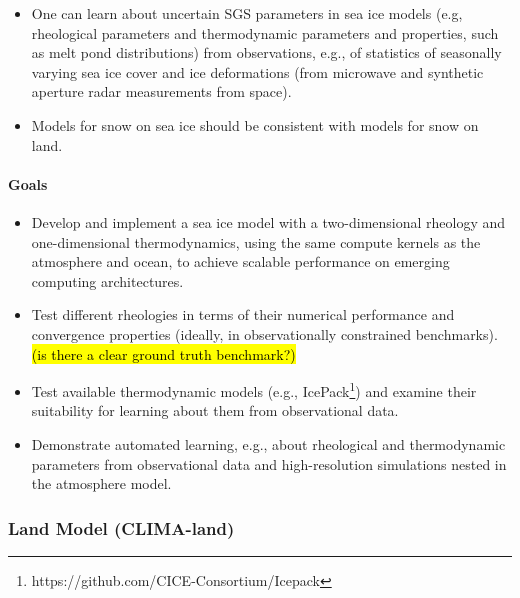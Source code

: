 \documentclass{article}
\begin{document}
\begin{itemize}
\item One can learn about uncertain SGS parameters in sea ice models (e.g, rheological parameters and thermodynamic parameters and properties, such as melt pond distributions) from observations, e.g., of statistics of seasonally varying sea ice cover and ice deformations (from microwave and synthetic aperture radar measurements from space).
\item Models for snow on sea ice should be consistent with models for snow on land.
\end{itemize}

\paragraph{Goals}
\begin{itemize}
    \item Develop and implement a sea ice model with a two-dimensional rheology and one-dimensional thermodynamics, using the same compute kernels as the atmosphere and ocean, to achieve scalable performance on emerging computing architectures. 
    \item Test different rheologies in terms of their numerical performance and convergence properties (ideally, in observationally constrained benchmarks). \hl{(is there a clear ground truth benchmark?)}
    \item Test available thermodynamic models (e.g., IcePack\footnote{https://github.com/CICE-Consortium/Icepack}) and examine their suitability for learning about them from observational data.
    \item Demonstrate automated learning, e.g., about rheological and thermodynamic parameters from observational data and high-resolution simulations nested in the atmosphere model.
 \end{itemize}

\subsubsection{Land Model (CLIMA-land)}
\end{document}
